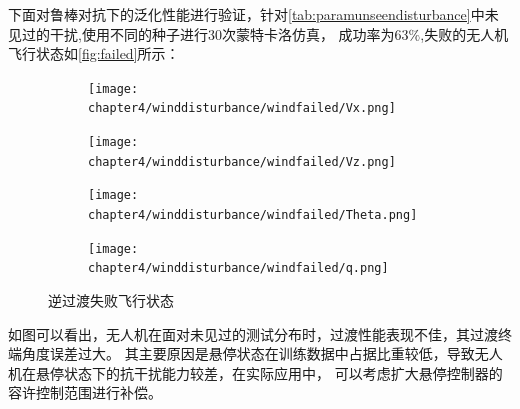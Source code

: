 下面对鲁棒对抗下的泛化性能进行验证，针对\autoref{tab:paramunseendisturbance}中未见过的干扰,使用不同的种子进行30次蒙特卡洛仿真，
成功率为63$\%$,失败的无人机飞行状态如\autoref{fig:failed}所示：
\begin{figure}[H]
    \centering
    \begin{subfigure}{.55\textwidth}
        \centering
        \texttt{[image: chapter4/winddisturbance/windfailed/Vx.png]}
        \label{fig:sub1}
        \end{subfigure}%
        \begin{subfigure}{.55\textwidth}
        \centering
        \texttt{[image: chapter4/winddisturbance/windfailed/Vz.png]}
        \label{fig:sub2}
        \end{subfigure}
    \begin{subfigure}{.55\textwidth}
        \centering
        \texttt{[image: chapter4/winddisturbance/windfailed/Theta.png]}
        \label{fig:sub3}
    \end{subfigure}%
    \begin{subfigure}{.55\textwidth}
        \centering
        \texttt{[image: chapter4/winddisturbance/windfailed/q.png]}
        \label{fig:sub4}
    \end{subfigure}
\caption{逆过渡失败飞行状态}
\label{fig:failed}
\end{figure}
如图可以看出，无人机在面对未见过的测试分布时，过渡性能表现不佳，其过渡终端角度误差过大。
其主要原因是悬停状态在训练数据中占据比重较低，导致无人机在悬停状态下的抗干扰能力较差，在实际应用中，
可以考虑扩大悬停控制器的容许控制范围进行补偿。

